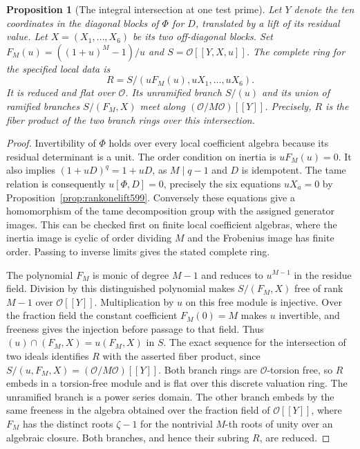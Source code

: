 \documentclass[a4paper,11pt]{article}
\newtheorem{proposition}{Proposition}[section]
\theoremstyle{definition}
\theoremstyle{remark}
\numberwithin{equation}{section}
\begin{document}
\begin{proposition}[The integral intersection at one test prime]
\leavevmode\label{prop:tamebranches614}
Let \(Y\) denote the ten coordinates in the diagonal blocks
of \(\Phi\) for \(D\), translated by a lift of its residual value.
Let \(X=(X_1,\ldots,X_6)\) be its two off-diagonal blocks.
Set \(F_M(u)=((1+u)^M-1)/u\) and \(S=\mathcal O[[Y,X,u]]\).
The complete ring for the specified local data is
\[
 R=S/(uF_M(u),uX_1,\ldots,uX_6).
\]
It is reduced and flat over \(\mathcal O\). Its unramified
branch \(S/(u)\) and its union of ramified branches
\(S/(F_M,X)\) meet along \((\mathcal O/M\mathcal O)[[Y]]\).
Precisely, \(R\) is the fiber product of the two branch rings
over this intersection.
\end{proposition}
\begin{proof}
Invertibility of \(\Phi\) holds over every local coefficient
algebra because its residual determinant is a unit. The order
condition on inertia is \(uF_M(u)=0\). It also implies
\((1+uD)^q=1+uD\), as \(M\mid q-1\) and \(D\) is idempotent.
The tame relation is consequently \(u[\Phi,D]=0\), precisely the
six equations \(uX_a=0\) by Proposition~\ref{prop:rankonelift599}.
Conversely these equations give a homomorphism of the tame
decomposition group with the assigned generator images. This
can be checked first on finite local coefficient algebras, where
the inertia image is cyclic of order dividing \(M\) and the
Frobenius image has finite order. Passing to inverse limits
gives the stated complete ring.

The polynomial \(F_M\) is monic of degree \(M-1\) and reduces
to \(u^{M-1}\) in the residue field. Division by this distinguished
polynomial makes \(S/(F_M,X)\) free of rank \(M-1\) over
\(\mathcal O[[Y]]\). Multiplication by \(u\) on this free
module is injective. Over the fraction field the constant
coefficient \(F_M(0)=M\) makes \(u\) invertible, and freeness
gives the injection before passage to that field. Thus
\((u)\cap(F_M,X)=u(F_M,X)\) in \(S\). The exact sequence for
the intersection of two ideals identifies \(R\) with the asserted
fiber product, since \(S/(u,F_M,X)=(\mathcal O/M\mathcal O)[[Y]]\).
Both branch rings are \(\mathcal O\)-torsion free, so \(R\) embeds
in a torsion-free module and is flat over this discrete valuation
ring. The unramified branch is a power series domain. The other
branch embeds by the same freeness in the algebra obtained over
the fraction field of \(\mathcal O[[Y]]\), where \(F_M\) has the
distinct roots \(\zeta-1\) for the nontrivial \(M\)-th roots of
unity over an algebraic closure. Both branches, and hence their
subring \(R\), are reduced.
\end{proof}
\end{document}
